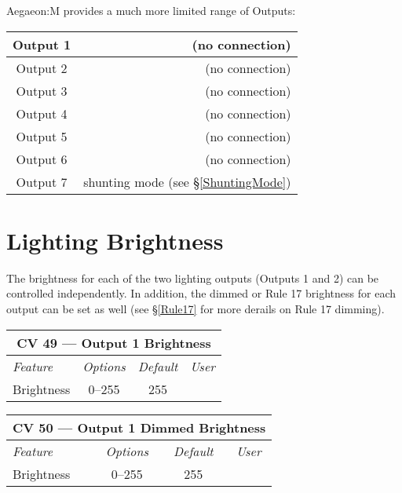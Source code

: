 \documentclass[12pt,letterpaper,draft]{memoir} %
\begin{document}
Aegaeon:M provides a much more limited range of Outputs:

\begin{center}
\begin{tabular}{|c|r|}
\hline
Output 1 & (no connection) \\ \hline
Output 2 & (no connection) \\ \hline
Output 3 & (no connection) \\ \hline
Output 4 & (no connection) \\ \hline
Output 5 & (no connection) \\ \hline
Output 6 & (no connection) \\ \hline
Output 7 & shunting mode (see \S\ref{ShuntingMode})\\ \hline
\end{tabular}
\end{center}

\section{Lighting Brightness}

The brightness for each of the two lighting outputs (Outputs 1 and 2) can be controlled independently. In addition, the dimmed or Rule 17 brightness for each output can be set as well (see \S\ref{Rule17} for more derails on Rule 17 dimming).

\label{CV49}
\begin{center}
\begin{tabular}{|l|c|c|c|}
\hline
\multicolumn{4}{|c|}{\textbf{CV 49 --- Output 1 Brightness}} \\ \hline \hline
\textit{Feature} & \textit{Options} & \textit{Default} & \textit{User} \\ \hline
Brightness & 0--255 & 255 &\\ \hline
\end{tabular}
\end{center}

\label{CV50}
\begin{center}
\begin{tabular}{|l|c|c|c|}
\hline
\multicolumn{4}{|c|}{\textbf{CV 50 --- Output 1 Dimmed Brightness}} \\ \hline \hline
\textit{Feature} & \textit{Options} & \textit{Default} & \textit{User} \\ \hline
Brightness & 0--255 & 255 &\\ \hline
\end{tabular}
\end{center}
\end{document}
